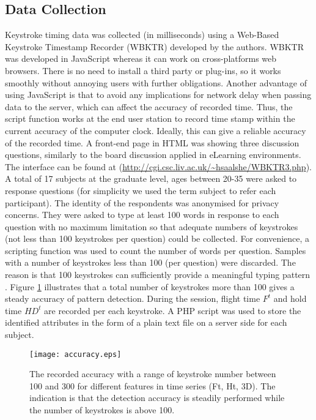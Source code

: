 \documentclass[runningheads,a4paper]{llncs}
\begin{document}
\subsection{Data Collection} \label{subsec:dataCollection}
Keystroke timing data was collected (in milliseconds) using a Web-Based Keystroke Timestamp Recorder (WBKTR) developed by the authors. WBKTR was developed in JavaScript whereas it can work on cross-platforms web browsers. There is no need to install a third party or plug-ins, so it works smoothly without annoying users with further obligations. Another advantage of using JavaScript is that to avoid any implications for network delay when passing data to the server, which can affect the accuracy of recorded time. Thus, the script function works at the end user station to record time stamp within the current accuracy of the computer clock. Ideally, this can give a reliable accuracy of the recorded time. A front-end page in HTML was showing three discussion questions, similarly to the board discussion applied in eLearning environments. The interface can be found at (\url{http://cgi.csc.liv.ac.uk/~hsaalshe/WBKTR3.php}). A total of 17 subjects at the graduate level, ages between 20-35 were asked to response questions (for simplicity we used the term subject to refer each participant). The identity of the respondents was anonymised for privacy concerns. They were asked to type at least 100 words in response to each question with no maximum limitation so that adequate numbers of keystrokes (not less than 100 keystrokes per question) could be collected. For convenience, a scripting function was used to count the number of words per question. Samples with a number of keystrokes less than 100 (per question) were discarded. The reason is that 100 keystrokes can sufficiently provide a meaningful typing pattern \cite{gunetti2005keystroke}. Figure \ref{fig:accuracy_with_different_rangeOfKeystrokes} illustrates that a total number of keystrokes more than 100 gives a steady accuracy of pattern detection. During the session, flight time $F^t$ and hold time $HD^t$ are recorded per each keystroke. A PHP script was used to store the identified attributes in the form of a plain text file on a server side for each subject. 

\begin{figure}
\centering
\texttt{[image: accuracy.eps]}
\caption{The recorded accuracy with a range of keystroke number between 100 and 300 for different features in time series (Ft, Ht, 3D). The indication is that the detection accuracy is steadily performed while the number of keystrokes is above 100.}
\label{fig:accuracy_with_different_rangeOfKeystrokes}
\end{figure}
\end{document}
